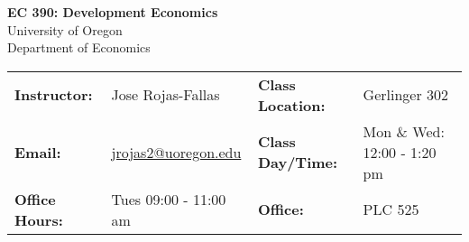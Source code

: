 \begin{center}
\textbf{\huge EC 390: Development Economics}\\ 
\vspace{0.1in}
University of Oregon\\ 
Department of Economics\\ 
\end{center}
\vspace{-.2in}
\begin{center}\begin{tabular}{llll}
\toprule
    \textbf{Instructor:} & \footnotesize{Jose Rojas-Fallas} & \textbf{Class Location:}  & {\footnotesize Gerlinger 302} \\ 
    \textbf{Email:} & \footnotesize{\href{mailto:jrojas2@uoregon.edu}{jrojas2@uoregon.edu}} & \textbf{Class Day/Time:} & \footnotesize{Mon \& Wed: 12:00 - 1:20 pm} \\
    \textbf{Office Hours:} & \footnotesize{Tues 09:00 - 11:00 am} & \textbf{Office:} & \footnotesize{PLC 525}\\
\bottomrule
\end{tabular}
\end{center}